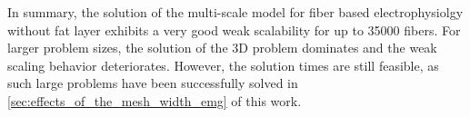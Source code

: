 In summary, the solution of the multi-scale model for fiber based electrophysiolgy without fat layer exhibits a very good weak scalability for up to \num{35000} fibers. For larger problem sizes, the solution of the 3D problem dominates and the weak scaling behavior deteriorates. However, the solution times are still feasible, as such large problems have been successfully solved in \cref{sec:effects_of_the_mesh_width_emg} of this work.



